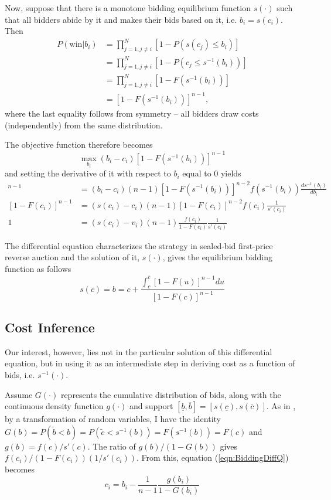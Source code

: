 \documentclass[11pt]{article}
\begin{document}
Now, suppose that there is a monotone bidding equilibrium function $s(\cdot)$ such that 
all bidders abide by it and makes their bids based on it, i.e. $b_i = s(c_i)$. 
Then
\begin{align*}
    P(\text{win}|b_i) &= \prod_{j=1, j \neq i}^{N}[1-P(s(c_j) \leq b_i)] \\ 
        &= \prod_{j=1, j \neq i}^{N}[1-P(c_j \leq s^{-1}(b_i))] \\ 
        &= \prod_{j=1, j \neq i}^{N}[1-F(s^{-1}(b_i))] \\ 
        &= [1-F(s^{-1}(b_i))]^{n-1}, 
\end{align*}
where the last equality follows from symmetry -- all bidders draw costs (independently) 
from the same distribution. 

The objective function therefore becomes 
$$ \max_{b_i} (b_i - c_i)[1-F(s^{-1}(b_i))]^{n-1}$$ 
and setting the derivative of it with respect to $b_i$ equal to 0 yields
\begin{align}
    [1-F(s^{-1}(b_i))]^{n-1} &= (b_i -c_i)(n-1)[1-F(s^{-1}(b_i))]^{n-2}f(s^{-1}(b_i))\frac{d s^{-1}(b_i)}{d b_i} \nonumber \\
    [1-F(c_i)]^{n-1} &= (s(c_i) -c_i)(n-1)[1-F(c_i)]^{n-2}f(c_i)\frac{1}{s'(c_i)} \nonumber \\
    1 &= (s(c_i)-v_i)(n-1)\frac{f(c_i)}{1-F(c_i)}\frac{1}{s'(c_i)}     \label{eqn:BiddingDiffQ}
\end{align}

The differential equation characterizes the strategy in sealed-bid first-price 
reverse auction and the solution of it, $s(\cdot)$, gives the equilibrium 
bidding function as follows \cite{HubbardPaarsch2009}
\begin{equation}
    s(c) = b =  c + \frac{\int_c^{\overline{c}} [1 - F(u)]^{n-1} du}{[1 - F(c)]^{n-1}}
    \label{eqn:BiddingFunction}
\end{equation}


\subsection{Cost Inference}
Our interest, however, lies not in the particular solution 
of this differential equation, but in using it as an intermediate step 
in deriving cost as a function of bids, i.e. $s^{-1}(\cdot)$.

Assume $G(\cdot)$ represents the cumulative distribution of bids, 
along with the continuous density function $g(\cdot)$ and support 
$[\underline{b}, \overline{b}] = [s(\underline{c}), s(\overline{c})]$.
As in \citeauthor{Guerreetal2000} \citeyear{Guerreetal2000}, by a transformation of random variables, I have the identity 
$G(b) = P(\tilde{b} < b) = P(\tilde{c} < s^{-1}(b)) = F(s^{-1}(b)) = F(c)$
and $g(b) = f(c) /s'(c)$. The ratio of $g(b)/(1 - G(b))$ gives 
$f(c_i)/(1-F(c_i))(1/s'(c_i))$. From this, equation (\ref{eqn:BiddingDiffQ}) becomes 
\begin{equation}
    \label{eqn:ReverseFunction}
    c_i = b_i - \frac{1}{n-1}\frac{g(b_i)}{1-G(b_i)}
\end{equation}
\end{document}
